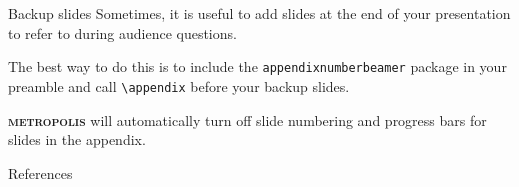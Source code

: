 \documentclass[10pt]{beamer}
\newcommand{\themename}{\textbf{\textsc{metropolis}}\xspace}
\begin{document}
\appendix

\begin{frame}[fragile]{Backup slides}
  Sometimes, it is useful to add slides at the end of your presentation to
  refer to during audience questions.

  The best way to do this is to include the \verb|appendixnumberbeamer|
  package in your preamble and call \verb|\appendix| before your backup slides.

  \themename will automatically turn off slide numbering and progress bars for
  slides in the appendix.  \cite{ConcreteMath}
\end{frame}

\begin{frame}[allowframebreaks]{References}

  
  

\end{frame}
\end{document}
